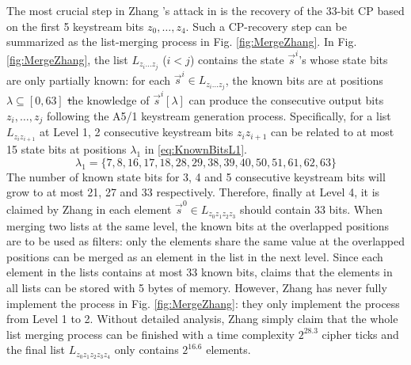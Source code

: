 The most crucial step in Zhang \etal's attack in \cite{AC:Zhang19} is the recovery of the 33-bit CP based on the first 5 keystream bits $z_0,\ldots, z_4$.
Such a CP-recovery step can be summarized as the list-merging process in Fig. \ref{fig:MergeZhang}.
In Fig. \ref{fig:MergeZhang}, the list $L_{z_i\ldots z_j}$ ($i<j$) contains the state $\vec{s}^i$'s whose state bits are only partially known:
for each $\vec{s}^i\in L_{z_i\ldots z_j}$, the known bits are at positions $\lambda\subseteq [0,63]$ \st the knowledge of $\vec{s}^i[\lambda]$ can produce the consecutive output bits $z_i,\ldots, z_j$ following the A5/1 keystream generation process.
Specifically, for a list $L_{z_iz_{i+1}}$ at Level 1, 2 consecutive keystream bits $z_iz_{i+1}$ can be related to at most 15 state bits at positions $\lambda_1$ in \eqref{eq:KnownBitsL1}.
\begin{equation}\label{eq:KnownBitsL1}
\lambda_1=\{7,8,16,17,18,  28,29,38,39,40,  50,51,61,62,63\}
\end{equation}
The number of known state bits for 3, 4 and 5 consecutive keystream bits will grow to at most 21, 27 and 33 respectively.
Therefore, finally at Level 4, it is claimed by Zhang \etal in \cite{AC:Zhang19} each element $\vec{s}^0\in L_{z_0z_1z_2z_3}$ should contain 33 bits.
When merging two lists at the same level, the known bits at the overlapped positions are to be used as filters: only the elements share the same value at the overlapped positions can be merged as an element in the list in the next level.
Since each element in the lists contains at most 33 known bits, \cite{AC:Zhang19} claims that the elements in all lists can be stored with 5 bytes of memory.
However, Zhang \etal has never fully implement the process in Fig. \ref{fig:MergeZhang}:
they only implement the process from Level 1 to 2.
Without detailed analysis, Zhang \etal simply claim that the whole list merging process can be finished with a time complexity $2^{28.3}$ cipher ticks and the final list $L_{z_0z_1z_2z_3z_4}$ only contains $2^{16.6}$ elements.

